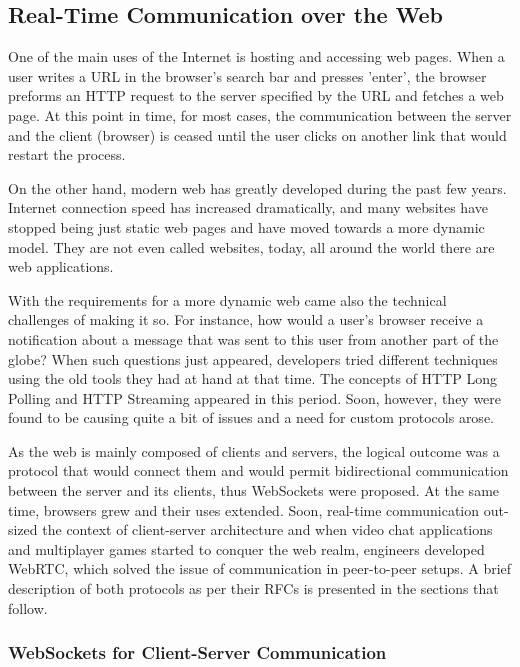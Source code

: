 \subsection{Real-Time Communication over the Web}

One of the main uses of the Internet is hosting and accessing web pages. When a
user writes a URL in the browser's search bar and presses 'enter', the browser
preforms an HTTP request to the server specified by the URL and fetches a web
page. At this point in time, for most cases, the communication between the
server and the client (browser) is ceased until the user clicks on another link
that would restart the process.

On the other hand, modern web has greatly developed during the past few years.
Internet connection speed has increased dramatically, and many websites have
stopped being just static web pages and have moved towards a more dynamic model.
They are not even called websites, today, all around the world there are web
applications.

With the requirements for a more dynamic web came also the technical challenges
of making it so. For instance, how would a user's browser receive a notification
about a message that was sent to this user from another part of the globe? When
such questions just appeared, developers tried different techniques using the
old tools they had at hand at that time. The concepts of HTTP Long Polling and
HTTP Streaming appeared in this period. Soon, however, they were found to be
causing quite a bit of issues\cite{long_polling_issues} and a need for custom
protocols arose.

As the web is mainly composed of clients and servers, the logical outcome was a
protocol that would connect them and would permit bidirectional communication
between the server and its clients, thus WebSockets were proposed. At the same
time, browsers grew and their uses extended. Soon, real-time communication out-
sized the context of client-server architecture and when video chat applications
and multiplayer games started to conquer the web realm, engineers developed
WebRTC, which solved the issue of communication in peer-to-peer setups. A brief
description of both protocols as per their RFCs is presented in the sections
that follow.

\subsubsection{WebSockets for Client-Server Communication} %

